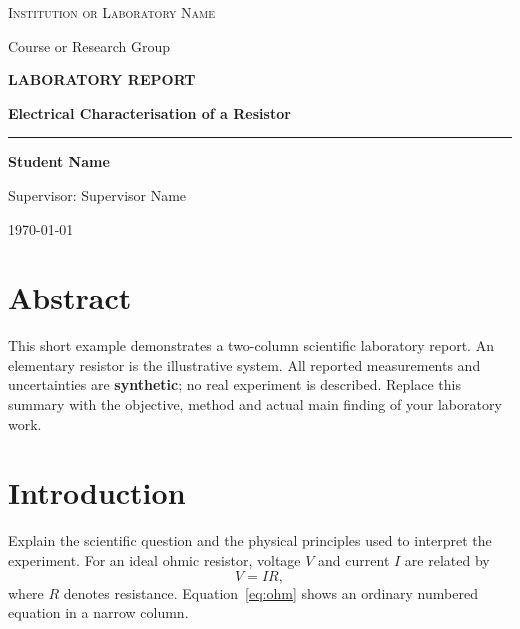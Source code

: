 \documentclass[10pt,a4paper]{article}
\newcommand{\reporttitle}{Electrical Characterisation of a Resistor}
\newcommand{\reportauthor}{Student Name}
\newcommand{\reportinstitution}{Institution or Laboratory Name}
\newcommand{\reportcourse}{Course or Research Group}
\newcommand{\reportsupervisor}{Supervisor Name}
\newcommand{\reportdate}{\today}
\begin{document}
\hypersetup{pageanchor=false}
\begin{titlepage}
  \centering
  \vspace*{2cm}
  {\large\color{reportmuted}\scshape\reportinstitution\par}
  \vspace{0.35cm}
  {\normalsize\color{reportmuted}\reportcourse\par}
  \vspace{2.7cm}
  {\small\bfseries\color{reportaccent}\MakeUppercase{Laboratory Report}\par}
  \vspace{0.6cm}
  {\Huge\bfseries\reporttitle\par}
  \vspace{0.8cm}
  {\color{reportaccent}\rule{0.25\textwidth}{1.4pt}\par}
  \vfill
  {\large\bfseries\reportauthor\par}
  \vspace{0.35cm}
  {\normalsize\color{reportmuted}Supervisor: \reportsupervisor\par}
  \vspace{0.5cm}
  {\normalsize\reportdate\par}
  \vspace{1.0cm}
\end{titlepage}
\hypersetup{pageanchor=true}

\twocolumn

\section*{Abstract}
This short example demonstrates a two-column scientific laboratory report.
An elementary resistor is the illustrative system. All reported measurements
and uncertainties are \textbf{synthetic}; no real experiment is described.
Replace this summary with the objective, method and actual main finding of
your laboratory work.

\section{Introduction}
\label{sec:introduction}
Explain the scientific question and the physical principles used to interpret
the experiment. For an ideal ohmic resistor, voltage \(V\) and current \(I\)
are related by
\begin{equation}
    V = IR,
    \label{eq:ohm}
\end{equation}
where \(R\) denotes resistance. Equation~\eqref{eq:ohm} shows an ordinary
numbered equation in a narrow column.
\end{document}
